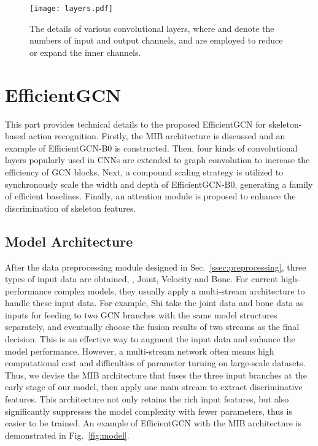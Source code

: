 \documentclass[10pt,journal,compsoc]{IEEEtran}
\begin{document}
\begin{figure*}[t]
  \centerline{\texttt{[image: layers.pdf]}}
  \vspace{-0.4cm}
  \caption{The details of various convolutional layers, where  and  denote the numbers of input and output channels,  and  are employed to reduce or expand the inner channels. \bv}\label{fig:layers}
  \vspace{-0.4cm}
\end{figure*}

\section{EfficientGCN}
\label{sec:efficientgcn}

This part provides technical details to the proposed EfficientGCN for skeleton-based action recognition. Firstly, the MIB architecture is discussed and an example of EfficientGCN-B0 is constructed. Then, four kinds of convolutional layers popularly used in CNNs are extended to graph convolution to increase the efficiency of GCN blocks. Next, a compound scaling strategy is utilized to synchronously scale the width and depth of EfficientGCN-B0, generating a family of efficient baselines. Finally, an attention module is proposed to enhance the discrimination of skeleton features.

\subsection{Model Architecture}
\label{ssec:architecture}

After the data preprocessing module designed in Sec.~\ref{ssec:preprocessing}, three types of input data are obtained, \ie, Joint, Velocity and Bone. For current high-performance complex models, they usually apply a multi-stream architecture to handle these input data. For example, Shi \etal \cite{shi2019two} take the joint data and bone data as inputs for feeding to two GCN branches with the same model structures separately, and eventually choose the fusion results of two streams as the final decision. This is an effective way to augment the input data and enhance the model performance. However, a multi-stream network often means high computational cost and difficulties of parameter turning on large-scale datasets. Thus, we devise the MIB architecture that fuses the three input branches at the early stage of our model, then apply one main stream to extract discriminative features. This architecture not only retains the rich input features, but also significantly suppresses the model complexity with fewer parameters, thus is easier to be trained. An example of EfficientGCN with the MIB architecture is demonstrated in Fig.~\ref{fig:model}.
\end{document}
